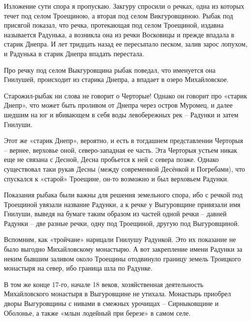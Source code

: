Изложение сути спора я пропускаю. Закгуру спросили о речках, одна из которых течет под селом Троещиною, а вторая под селом Викгуровщиною. Рыбак под присягой показал, что речка, протекающая под селом Троещиной, издавна называется Радунька, а возникла она из речки Восковицы и прежде впадала в старик Днепра. И лет тридцать назад ее пересыпало песком, залив зарос лопухом, и Радунька в старик Днепра впадать перестала. 

Про речку под селом Выкгуровщина рыбак поведал, что именуется она Гнилушей, происходит из старика Днепра, а впадает в озеро Михайловское.

Старожил-рыбак ни слова не говорит о Черторые! Однако он говорит про «старик Днепр», что может быть проливом от Днепра через остров Муромец, и далее шедшим на юг и вбивающем в себя воды левобережных рек – Радунки и затем Гнилуши.

Этот же «старик Днепр», вероятно, и есть в тогдашнем представлении Черторыя – вернее, верховье оной, северо-западная ее часть. Эта Черторыя устьем никак еще не связана с Десной, Десна пробьется к ней с севера позже. Однако существовал таки рукав Десны (между современной Десёнкой и Погребами), что спускался к «старой» Троещине, он-то возможно и был верховьем Радунки. 

Показания рыбака были важны для решения земельного спора, ибо с речкой под Троещиной увязали название Радунки, а к речке у Выгуровщине привязали имя Гнилуши, выведя на бумаге таким образом из частей одной речки – давней Радунки – две разные речки, одну под Троещиной, другую под Выгуровщиной.

Вспомним, как «тройчане» нарицали Гнилушу Радункой. Это их показание не было выгодно Михайловскому монастырю. А вот закрепление имени Радунки за неким бывшим заливом около Троещины отодвинуло границу земель  Троицкого монастыря на север, ибо граница шла по Радунке.


В том же конце 17-го, начале 18 веков, хозяйственная деятельность Михайловского монастыря в Выгуровщине не утихала. Монастырь приобрел дворы Выгуровщины с нивами в смежных урочищах – Сирныковщине и Оболонье, а также «млын лодейный при березе» в самом селе.

